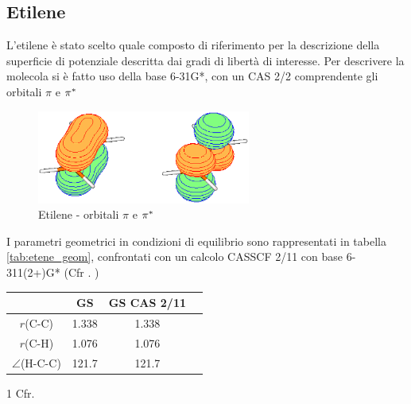 \subsection{Etilene}

L'etilene \`e stato scelto quale composto di riferimento per la descrizione
della superficie di potenziale descritta dai gradi di libert\`a di interesse.
Per descrivere la molecola si \`e fatto uso della base 6-31G*, con un CAS 2/2
comprendente gli orbitali $\pi$ e $\pi^{*}$

\begin{figure}[ht]
\begin{center}
\includegraphics[angle=0,width=7cm,keepaspectratio]{immagini/etene/orbitali.eps}
\parbox[h]{10cm}{
\caption{\small Etilene - orbitali $\pi$ e $\pi^{*}$}
\label{fig:etene_orbitali}
}
\end{center}
\end{figure}

I parametri geometrici in condizioni di equilibrio sono rappresentati in
tabella \ref{tab:etene_geom}, confrontati con un calcolo CASSCF
2/11 con base 6-311(2+)G* (Cfr . \cite{jcp-105-20-1996-9007})
\begin{center}
\begin{threeparttable}
\caption{\small Etilene - geometria per lo stato fondamentale}
\label{tab:etene_geom}
\small
\begin{tabular}{|ccc|c|}
\hline
							& GS		& GS CAS 2/11\tnote{1} \\ 
\hline
$r$(C-C)					& 1.338		& 1.338	\\
$r$(C-H)					& 1.076		& 1.076	 \\
$\angle$(H-C-C)				& 121.7		& 121.7	 \\
\hline
\end{tabular}
\begin{tablenotes}
\small
 \item[1] Cfr. \cite{jcp-105-20-1996-9007}
\end{tablenotes}
\end{threeparttable}
\end{center}

